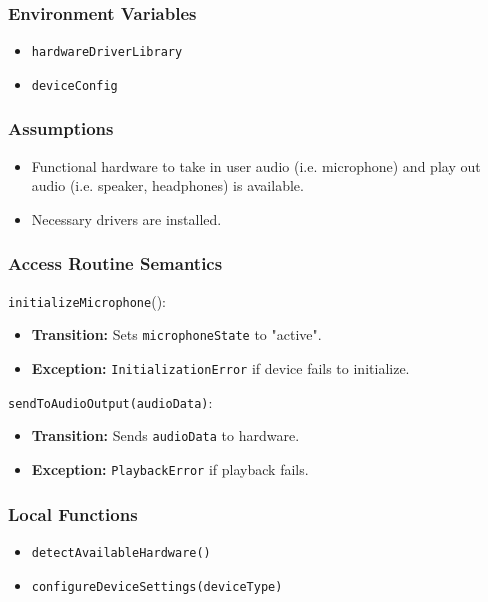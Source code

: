 \documentclass[12pt, titlepage]{article}
\begin{document}
\subsubsection{Environment Variables}  
\begin{itemize}  
    \item \texttt{hardwareDriverLibrary}  
    \item \texttt{deviceConfig}  
\end{itemize}  

\subsubsection{Assumptions}  
\begin{itemize}  
    \item Functional hardware to take in user audio (i.e. microphone) and play out audio (i.e. speaker, headphones) is available.
    \item Necessary drivers are installed.  
\end{itemize}  

\subsubsection{Access Routine Semantics}  

\noindent \texttt{initializeMicrophone}():
\begin{itemize}  
    \item \textbf{Transition:} Sets \texttt{microphoneState} to "active".  
    \item \textbf{Exception:} \texttt{InitializationError} if device fails to initialize.  
\end{itemize}  

\noindent \texttt{sendToAudioOutput(audioData)}:
\begin{itemize}  
    \item \textbf{Transition:} Sends \texttt{audioData} to hardware.  
    \item \textbf{Exception:} \texttt{PlaybackError} if playback fails.  
\end{itemize}  

\subsubsection{Local Functions}  
\begin{itemize}  
    \item \texttt{detectAvailableHardware()}  
    \item \texttt{configureDeviceSettings(deviceType)}  
\end{itemize}  
\end{document}
